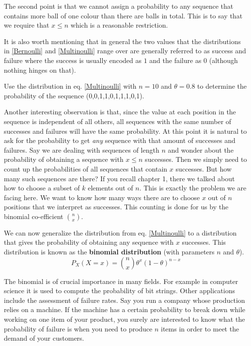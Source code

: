 \documentclass[a4paper,11pt,leqno]{report}
\begin{document}
The second point is that we cannot assign a probability to any sequence that contains more ball of one colour than there are balls in total.
This is to say that we require that $ x \leq n $ which is a reasonable restriction. 

It is also worth mentioning that in general the two values that the distributions in \ref{Bernoulli} and \ref{Multinoulli} range
over are generally referred to as success and failure where the success is usually encoded as $ 1 $ and the failure as $ 0 $
(although nothing hinges on that). 

\begin{Exercise}
Use the distribution in eq. \ref{Multinoulli} with $ n = 10 $ and $ \theta = 0.8 $ to determine the probability of the sequence (0,0,1,1,0,1,1,1,0,1).
\end{Exercise}

Another interesting observation is that, since the value at each position in the sequence is independent of all others, all sequences with the same
number of successes and failures will have the same probability. At this point it is natural to ask for the probability to get \textit{any}
sequence with that amount of successes and failures. Say we are dealing with sequences of length $ n $ and wonder about the probability of 
obtaining a sequence with $ x \leq n $ successes. Then we simply need to count up the probabilities of all sequences that contain $ x $ 
successes. But how many such sequences are there? If you recall chapter 1, there we talked about how to choose a subset of $ k $ elements
out of $ n $. This is exactly the problem we are facing here. We want to know how many ways there are to choose $ x $ out of $ n $ positions
that we interpret as successes. This counting is done for us by the binomial co-efficient $ \binom{n}{x} $.

We can now generalize the distribution from eq. \ref{Multinoulli} to a distribution that gives the probability of obtaining any sequence
with $ x $ successes. This distribution is known as the \textbf{binomial distribution} (with parameters $ n $ and $ \theta $).
\begin{equation}
P_{X}(X=x) = \binom{n}{x} \theta^{x} (1-\theta)^{n-x}
\end{equation}

The binomial is of crucial importance in many fields. For example in computer science it is used to compute the probability of bit strings.
Other applications include the assessment of failure rates. Say you run a company whose production relies on a machine. If the machine
has a certain probability to break down while working on one item of your product, you surely are interested to know what the probability
of failure is when you need to produce $ n $ items in order to meet the demand of your customers.
\end{document}
